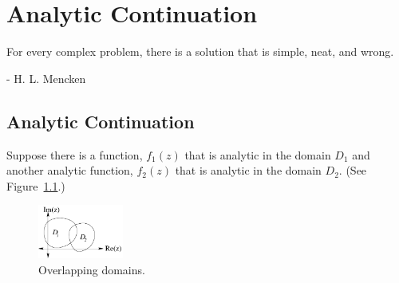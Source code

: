 
\flushbottom










\chapter{Analytic Continuation}


For every complex problem, there is a solution that is simple, neat, and wrong.

\begin{flushright}
  - H. L. Mencken
\end{flushright}






\section{Analytic Continuation}



Suppose there is a function, $f_1(z)$ that is analytic in the domain $D_1$ and
another analytic function, $f_2(z)$ that is analytic in the domain $D_2$.
(See Figure~\ref{overlap}.)

\begin{figure}[htb!]
  \begin{center}
    \includegraphics[width=0.25\textwidth]{fcv/continuation/overlap}
  \end{center}
  \caption{Overlapping domains.}
  \label{overlap}
\end{figure}

